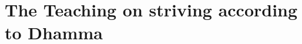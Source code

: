 %
%
%
%
%
%
%
%
%
%
%
%
%
%
%
%
%
%
%
%
%
%
%
%
%
%
%
%
%
%
%
%
%
%
%
%
%
%
%
%
\chapter{The Teaching on striving according to Dhamma}%

